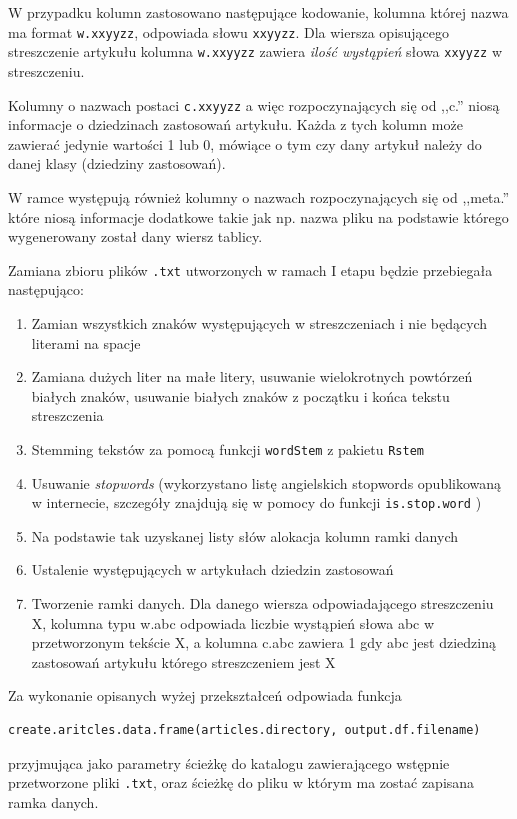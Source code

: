 \documentclass[a4paper,12pt]{article}
\begin{document}
		W przypadku kolumn zastosowano następujące kodowanie, kolumna 
		której nazwa ma format \texttt{w.xxyyzz}, odpowiada słowu
		\texttt{xxyyzz}. Dla wiersza opisującego streszczenie artykułu
		kolumna \texttt{w.xxyyzz} zawiera \emph{ilość wystąpień}
		słowa \texttt{xxyyzz} w streszczeniu.
		
		Kolumny o nazwach postaci \texttt{c.xxyyzz} a więc rozpoczynających
		się od ,,c.'' niosą informacje o dziedzinach zastosowań artykułu.
		Każda z tych kolumn może zawierać jedynie wartości 1 lub 0, mówiące
		o tym czy dany artykuł należy do danej klasy (dziedziny zastosowań).
		
		W ramce występują również kolumny o nazwach rozpoczynających się od
		,,meta.'' które niosą informacje dodatkowe takie jak np. nazwa pliku
		na podstawie którego wygenerowany został dany wiersz tablicy.
		
		Zamiana zbioru plików \texttt{.txt} utworzonych w ramach I etapu
		będzie przebiegała następująco:
		\begin{enumerate}
			\item
				Zamian wszystkich znaków występujących w streszczeniach
				i nie będących literami na spacje
			\item
				Zamiana dużych liter na małe litery, usuwanie wielokrotnych
				powtórzeń białych znaków, usuwanie białych znaków z początku
				i końca tekstu streszczenia
			\item
				Stemming tekstów za pomocą funkcji \texttt{wordStem}
				z pakietu \texttt{Rstem}
			\item
				Usuwanie \textit{stopwords} (wykorzystano listę
				angielskich stopwords opublikowaną w internecie,
				szczegóły znajdują się w pomocy do funkcji \texttt{is.stop.word}
				)
			\item
				Na podstawie tak uzyskanej listy słów alokacja kolumn
				ramki danych
			\item
				Ustalenie występujących w artykułach dziedzin zastosowań
			\item
				Tworzenie ramki danych. Dla danego wiersza odpowiadającego
				streszczeniu X, kolumna typu w.abc odpowiada liczbie wystąpień
				słowa abc w przetworzonym tekście X, a kolumna c.abc zawiera 
				1 gdy abc jest dziedziną zastosowań artykułu 
				którego streszczeniem jest X
		\end{enumerate}
		
		Za wykonanie opisanych wyżej przekształceń odpowiada 
		funkcja 
		\begin{verbatim}
create.aritcles.data.frame(articles.directory, output.df.filename)
		\end{verbatim}
		przyjmująca jako parametry ścieżkę do katalogu zawierającego
		wstępnie przetworzone pliki \texttt{.txt}, oraz ścieżkę do 
		pliku w którym ma zostać zapisana ramka danych.
		
\end{document}
